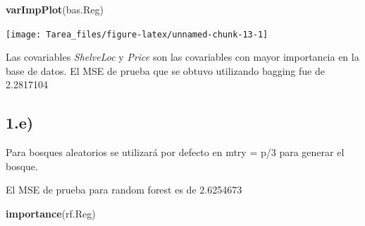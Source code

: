 \documentclass[
]{article}
\newenvironment{Shaded}{\begin{snugshade}}{\end{snugshade}}
\newcommand{\DataTypeTok}[1]{\textcolor[rgb]{0.13,0.29,0.53}{#1}}
\newcommand{\DecValTok}[1]{\textcolor[rgb]{0.00,0.00,0.81}{#1}}
\newcommand{\KeywordTok}[1]{\textcolor[rgb]{0.13,0.29,0.53}{\textbf{#1}}}
\newcommand{\NormalTok}[1]{#1}
\newcommand{\OperatorTok}[1]{\textcolor[rgb]{0.81,0.36,0.00}{\textbf{#1}}}
\newcommand{\OtherTok}[1]{\textcolor[rgb]{0.56,0.35,0.01}{#1}}
\newcommand{\StringTok}[1]{\textcolor[rgb]{0.31,0.60,0.02}{#1}}
\begin{document}
\begin{Shaded}
\begin{Highlighting}[]
\KeywordTok{varImpPlot}\NormalTok{(bas.Reg)}
\end{Highlighting}
\end{Shaded}

\begin{center}\texttt{[image: Tarea\_files/figure-latex/unnamed-chunk-13-1]} \end{center}

\begin{Shaded}
\end{Shaded}

Las covariables \emph{ShelveLoc} y \emph{Price} son las covariables con
mayor importancia en la base de datos. El MSE de prueba que se obtuvo
utilizando bagging fue de 2.2817104

\hypertarget{e}{%
\subsection{1.e)}\label{e}}

Para bosques aleatorios se utilizará por defecto en mtry = p/3 para
generar el bosque.

\begin{Shaded}
\end{Shaded}

El MSE de prueba para random forest es de 2.6254673

\begin{Shaded}
\begin{Highlighting}[]
\KeywordTok{importance}\NormalTok{(rf.Reg)}
\end{Highlighting}
\end{Shaded}
\end{document}
